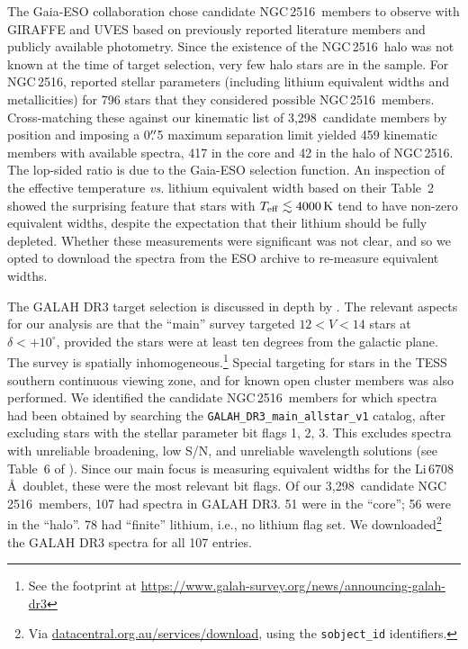 \documentclass[12pt,twocolumn,tighten]{aastex63}
\newcommand{\cn}{NGC\,2516} %
\newcommand{\nkinematic}{3{,}298} %
\begin{document}
The Gaia-ESO collaboration chose candidate \cn\ members to observe
with GIRAFFE and UVES based on previously reported literature members
and publicly available photometry.  Since the existence of the \cn\
halo was not known at the time of target selection, very few halo
stars are in the sample.  For \cn, \citet{randich_gaiaeso_2018}
reported stellar parameters (including lithium equivalent widths and
metallicities) for 796 stars that they considered possible \cn\
members.  Cross-matching these against our kinematic list of
\nkinematic\ candidate members by position and imposing a 0$\mbox{$.\!\!^{\prime\prime}$}$5
maximum separation limit yielded 459 kinematic members with available
spectra, 417 in the core and 42 in the halo of \cn.  The lop-sided
ratio is due to the Gaia-ESO selection function.  An inspection of the
effective temperature {\it vs{.}} lithium equivalent width based on
their Table~2 showed the surprising feature that stars with $T_{\rm
eff}\lesssim 4000\,{\rm K}$ tend to have non-zero equivalent widths,
despite the expectation that their lithium should be fully depleted.
Whether these measurements were significant was not clear, and so we
opted to download the spectra from the ESO archive to re-measure
equivalent widths.

The GALAH DR3 target selection is discussed in depth by
\citet{buder_galah_2020}.  The relevant aspects for our analysis are
that the ``main'' survey targeted $12<V<14$ stars at
$\delta<+10^\circ$, provided the stars were at least ten degrees from
the galactic plane.  The survey is spatially
inhomogeneous.\footnote{See the footprint at
\url{https://www.galah-survey.org/news/announcing-galah-dr3}} Special
targeting for stars in the TESS southern continuous viewing zone, and
for known open cluster members was also performed.  We identified the
candidate \cn\ members for which spectra had been obtained by
searching the \texttt{GALAH\_DR3\_main\_allstar\_v1} catalog, after
excluding stars with the stellar parameter bit flags 1, 2, 3.  This
excludes spectra with unreliable broadening, low S/N, and unreliable
wavelength solutions (see Table~6 of \citealt{buder_galah_2020}).
Since our main focus is measuring equivalent widths for the
Li\,6708\,\AA\ doublet, these were the most relevant bit flags.  Of
our \nkinematic\ candidate \cn\ members, 107 had spectra in GALAH DR3.
51 were in the ``core''; 56 were in the ``halo''.  78 had ``finite''
lithium, i.e., no lithium flag set.
We downloaded\footnote{Via \url{datacentral.org.au/services/download},
using the \texttt{sobject\_id} identifiers.} the GALAH DR3 spectra for
all 107 entries.  
\end{document}
